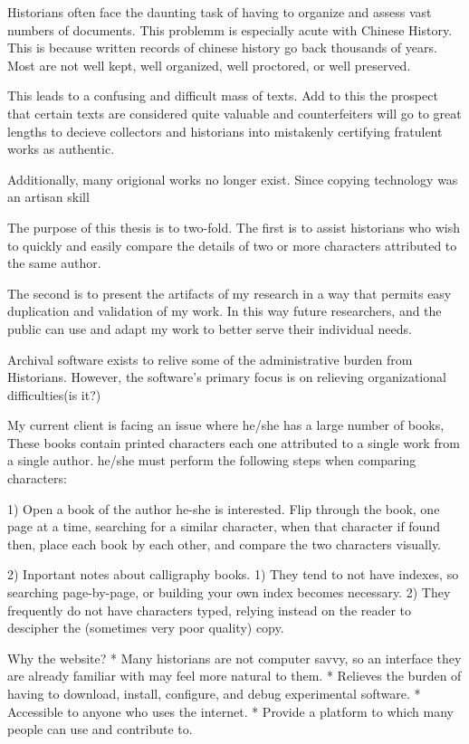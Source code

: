 Historians often face the daunting task of having to organize and assess vast numbers of documents.  This problemm is especially acute with Chinese History.  This is because written records of chinese history go back thousands of years.  Most are not well kept, well organized, well proctored, or well preserved.

This leads to a confusing and difficult mass of texts.  Add to this the prospect that certain texts are considered quite valuable and counterfeiters will go to great lengths to decieve collectors and historians into mistakenly certifying fratulent works as authentic.

Additionally, many origional works no longer exist.  Since copying technology was an artisan skill 


The purpose of this thesis is to two-fold.  The first is to assist historians who wish to quickly and easily compare the details of two or more characters attributed to the same author.

The second is to present the artifacts of my research in a way that permits easy duplication and validation of my work.  In this way future researchers, and the public can use and adapt my work to better serve their individual needs.

Archival software exists to relive some of the administrative burden from Historians.  However, the software's primary focus is on relieving organizational difficulties(is it?)  

My current client is facing an issue where he/she has a large number of books,  These books contain printed characters each one attributed to a single work from a single author.  he/she must perform the following steps when comparing characters:

1)  Open a book of the author he-she is interested.  Flip through the book, one page at a time, searching for a similar character, when that character if found then, place each book by each other, and compare the two characters visually.

2) Inportant notes about calligraphy books.  1)  They tend to not have indexes, so searching page-by-page, or building your own index becomes necessary.  2)  They frequently do not have characters typed, relying instead on the reader to descipher the (sometimes very poor quality) copy.

    
Why the website?
    * Many historians are not computer savvy, so an interface they are already familiar with may feel more natural to them.
    * Relieves the burden of having to download, install, configure, and debug experimental software.
    * Accessible to anyone who uses the internet.
    * Provide  a platform to which many people can use and contribute to.

